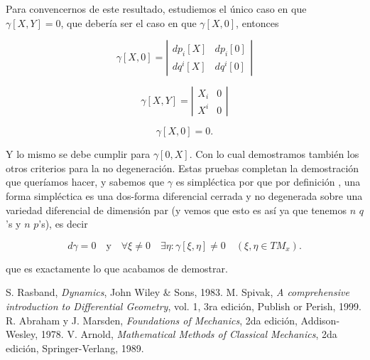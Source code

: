 \documentclass[a4paper,10pt]{article}
\numberwithin{equation}{section}
\begin{document}
\vspace{.3cm}

Para convencernos de este resultado, estudiemos el único caso en que $\gamma[X,Y] = 0$, 
que debería ser el caso en que $\gamma[X,0]$, entonces 

\begin{equation}
 \gamma[X,0] = \left|\begin{matrix}
                dp_i[X] & dp_i[0] \\
                dq^i[X] & dq^i[0]
               \end{matrix}\right|
\end{equation}

\begin{equation}
 \gamma[X,Y] = \left|\begin{matrix}
                X_i & 0 \\
                X^i & 0
               \end{matrix}\right|
\end{equation}

\begin{equation}
 \gamma[X,0] = 0.
\end{equation}

Y lo mismo se debe cumplir para $\gamma[0,X]$. Con lo cual demostramos también los otros 
criterios para la no degeneración. Estas pruebas completan la demostración que queríamos 
hacer, y sabemos que $\gamma$ es simpléctica por que por definición \cite{rasband,abraham,arnold},
una forma simpléctica es una dos-forma diferencial cerrada y no degenerada sobre 
una variedad diferencial de dimensión par (y vemos que esto es así ya que tenemos 
$n$ $q$'s y $n$ $p$'s), es decir 

\begin{equation}
 d\gamma = 0 \quad \text{y} \quad \forall \xi \ne 0 \quad \exists \eta: \gamma[\xi,\eta] \ne 0 
 \quad (\xi,\eta \in TM_x).
\end{equation}

que es exactamente lo que acabamos de demostrar.


\begin{thebibliography}{10}
S. Rasband, \emph{Dynamics}, John Wiley \& Sons, 1983.
M. Spivak, \emph{A comprehensive introduction to Differential Geometry}, vol. 1, 
3ra edición, Publish or Perish, 1999.
 R. Abraham y J. Marsden, \emph{Foundations of Mechanics}, 2da edición, Addison-Wesley,
 1978.
V. Arnold, \emph{Mathematical Methods of Classical Mechanics}, 2da edición, Springer-Verlang, 
1989.
 
\end{thebibliography}
\end{document}
